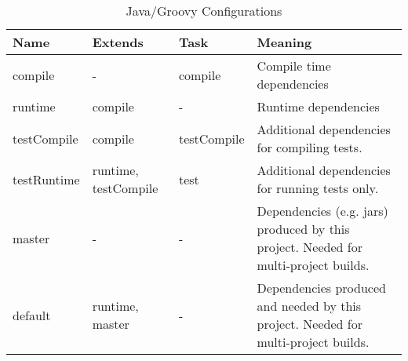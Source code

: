 


\begin{table}	
	\begin{tabularx}{\textwidth}{|l|l|l|X|} \hline
	\textbf{Name} & \textbf{Extends} & \textbf{Task} & \textbf{Meaning} \\ \hline
	compile & - & compile & Compile time dependencies\\ \hline
	runtime & compile & - & Runtime dependencies \\ \hline
	testCompile & compile & testCompile & Additional dependencies for compiling tests. \\ \hline
	testRuntime & runtime, testCompile & test & Additional dependencies for running tests only. \\ \hline
	master & - & - & Dependencies (e.g. jars) produced by this project. Needed for multi-project builds. \\ \hline
	default & runtime, master & - & Dependencies produced and needed by this project. Needed for multi-project builds. \\  \hline
	\end{tabularx}
	\caption{Java/Groovy Configurations}
	\label{tab:configurations}
\end{table}	

% 
% 
% 

